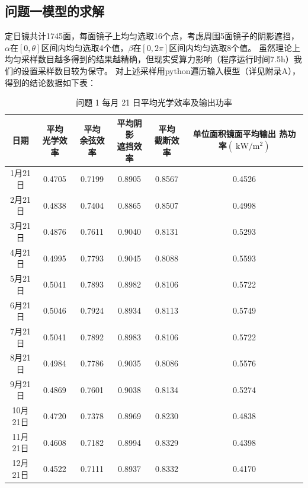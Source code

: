 \documentclass{article}
\numberwithin{equation}{subsection}
\begin{document}
\subsection{问题一模型的求解}
定日镜共计1745面，每面镜子上均匀选取16个点，考虑周围5面镜子的阴影遮挡，$\alpha$在$[0,\theta]$区间内均匀选取4个值，$\beta$在$[0,2\pi]$区间内均匀选取8个值。
虽然理论上均匀采样数目越多得到的结果越精确，但现实受算力影响（程序运行时间7.5h）我们的设置采样数目较为保守。
对上述采样用python遍历输入模型（详见附录A），得到的结论数据如下表：
\begin{table}[!htbp]
    \centering
    \begin{tabular}{|c|c|c|c|c|c|}\hline
        日期&\makecell[c]{平均\\光学效率}&\makecell[c]{平均\\余弦效率}&\makecell[c]{平均阴影\\遮挡效率}&\makecell[c]{平均\\截断效率}&\makecell[c]{单位面积镜面平均输出\\热功率$(\mathrm{~kW} / \mathrm{m}^2)$}\\\hline
        1月21日&0.4705& 	0.7199& 	0.8905& 	0.8567& 0.4526         \\\hline
        2月21日&0.4838& 	0.7404& 	0.8865& 	0.8507& 0.4998         \\\hline
        3月21日&0.4876& 	0.7611& 	0.9040& 	0.8131& 0.5293         \\\hline
        4月21日&0.4995& 	0.7793& 	0.9045& 	0.8088& 0.5593         \\\hline
        5月21日&0.5041& 	0.7893& 	0.8982& 	0.8106& 0.5722         \\\hline
        6月21日&0.5046& 	0.7924& 	0.8934& 	0.8113& 0.5749         \\\hline
        7月21日&0.5041& 	0.7892& 	0.8983& 	0.8106& 0.5722         \\\hline
        8月21日&0.4984& 	0.7786& 	0.9035& 	0.8086& 0.5576         \\\hline
        9月21日&0.4869& 	0.7601& 	0.9038& 	0.8134& 0.5274         \\\hline
        10月21日&0.4720& 	0.7378& 	0.8969& 	0.8230& 0.4838         \\\hline
        11月21日&0.4608& 	0.7182& 	0.8994& 	0.8329& 0.4398  \\\hline
        12月21日&0.4522&	0.7111& 	0.8937&	0.8332& 0.4170  \\
        \hline
    \end{tabular}
    \caption{问题 1 每月 21 日平均光学效率及输出功率}
\end{table}
\end{document}
